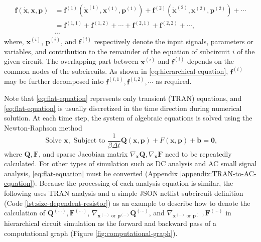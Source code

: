 \begin{equation}\label{eq:hierarchical-equation}
\begin{split}
\bm{f}(\bm{\dot{x}},\bm{x},\bm{p})
& = \bm{f}^{(1)}(\bm{\dot{x}}^{(1)},\bm{x}^{(1)},\bm{p}^{(1)})
+ \bm{f}^{(2)}(\bm{\dot{x}}^{(2)},\bm{x}^{(2)},\bm{p}^{(2)})
+ \cdots \\
& = \bm{f}^{(1,1)}+\bm{f}^{(1,2)}+\cdots+\bm{f}^{(2,1)}+\bm{f}^{(2,2)}+\cdots, \\
& \cdots
\end{split}\tag{Eq (Hierarchical)}
\end{equation}
where, $\bm{x}^{(i)}$, $\bm{p}^{(i)}$, and $\bm{f}^{(i)}$ respectively denote the input signals, parameters or variables, and contribution to the remainder of the equation of subcircuit $i$ of the given circuit. The overlapping part between $\bm{x}^{(i)}$ and $\bm{f}^{(i)}$ depends on the common nodes of the subcircuits. As shown in \ref{eq:hierarchical-equation}, $\bm{f}^{(i)}$ may be further decomposed into $\bm{f}^{(i,1)},\bm{f}^{(i,2)},\cdots$ as required.

Note that \ref{eq:flat-equation} represents only transient (TRAN) equations, and \ref{eq:flat-equation} is usually discretized in the time direction during numerical solution. At each time step, the system of algebraic equations is solved using the Newton-Raphson method
\cite[Section 7.1]{fijnvandraat2002time}
\[
\text{ Solve }\bm{x},\text{ Subject to }
\frac{1}{\beta\Delta t}\bm{Q}(\bm{x},\bm{p})+F(\bm{x},\bm{p})+\bm{b}=\bm{0},
\]
where $\bm{Q},\bm{F}$, and sparse Jacobian matrix $\nabla_{\bm{x}}\bm{Q},\nabla_{\bm{x}}\bm{F}$ need to be repeatedly calculated. For other types of simulation such as DC analysis and AC small signal analysis, \ref{eq:flat-equation} must be converted (Appendix \ref{appendix:TRAN-to-AC-equation}). Because the processing of each analysis equation is similar, the following uses TRAN analysis and a simple JSON netlist subcircuit definition (Code \ref{lst:size-dependent-resistor}) as an example to describe how to denote the calculation of $\bm{Q}^{(\cdots)},\bm{F}^{(\cdots)}$, $\nabla_{\bm{x}^{(\cdots)}\text{ or }\bm{p}^{(\cdots)}}\bm{Q}^{(\cdots)}$, and $\nabla_{\bm{x}^{(\cdots)}\text{ or }\bm{p}^{(\cdots)}}\bm{F}^{(\cdots)}$ in hierarchical circuit simulation as the forward and backward pass of a computational graph (Figure \ref{fig:computational-graph}).

